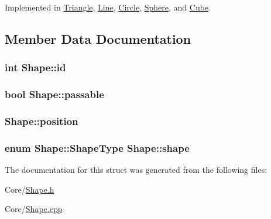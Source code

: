 Implemented in \hyperlink{structTriangle_a121aa12b2557c9f523f435253258bcb0}{Triangle}, \hyperlink{structLine_a16918493d6a5eaa3576ebb0c1f386197}{Line}, \hyperlink{structCircle_a38451429db18a58f763cee92f1bf1d1c}{Circle}, \hyperlink{structSphere_a310ace56647ecd875fb8801a26aa7f25}{Sphere}, and \hyperlink{structCube_a29ac05ab7f85061d15fe55b93c7893ea}{Cube}.



\subsection{Member Data Documentation}
\subsubsection[{\texorpdfstring{id}{id}}]{\setlength{\rightskip}{0pt plus 5cm}int Shape\+::id}\hypertarget{structShape_a41ed02597b39a932373ab72e9afe4d40}{}\label{structShape_a41ed02597b39a932373ab72e9afe4d40}
\subsubsection[{\texorpdfstring{passable}{passable}}]{\setlength{\rightskip}{0pt plus 5cm}bool Shape\+::passable}\hypertarget{structShape_aceee5417be9d3bd3281005fb9595bbbf}{}\label{structShape_aceee5417be9d3bd3281005fb9595bbbf}
\subsubsection[{\texorpdfstring{position}{position}}]{ Shape\+::position}\hypertarget{structShape_ad3beb609c430b969933e3b2fde67b634}{}\label{structShape_ad3beb609c430b969933e3b2fde67b634}
\subsubsection[{\texorpdfstring{shape}{shape}}]{\setlength{\rightskip}{0pt plus 5cm}enum {\bf Shape\+::\+Shape\+Type}  Shape\+::shape}\hypertarget{structShape_a90d5426ace59243509115743ad97598d}{}\label{structShape_a90d5426ace59243509115743ad97598d}


The documentation for this struct was generated from the following files\+:\begin{DoxyCompactItemize}
\item 
Core/\hyperlink{Shape_8h}{Shape.\+h}\item 
Core/\hyperlink{Shape_8cpp}{Shape.\+cpp}\end{DoxyCompactItemize}
